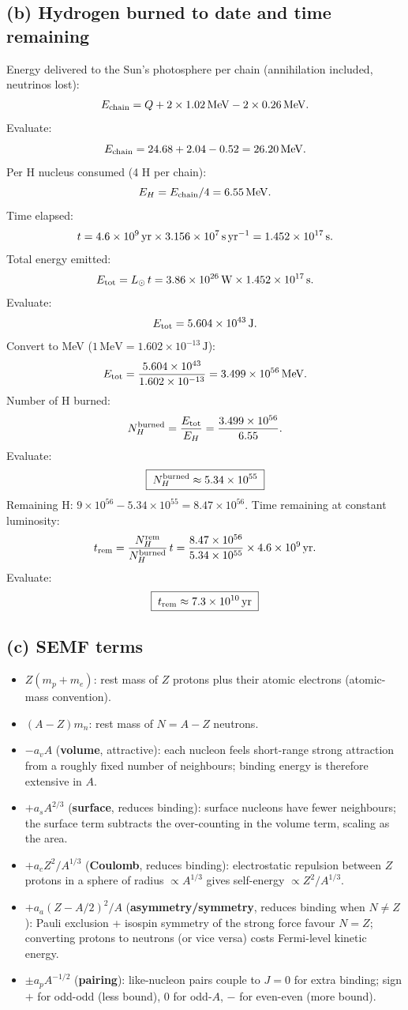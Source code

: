 \documentclass[11pt]{article}
\newcommand{\MeV}{\,\mathrm{MeV}}
\begin{document}
\subsection*{(b) Hydrogen burned to date and time remaining}

Energy delivered to the Sun's photosphere per chain (annihilation included, neutrinos lost):
\[
E_{\rm chain} = Q + 2\times 1.02\MeV - 2\times 0.26\MeV.
\]
Evaluate:
\[
E_{\rm chain} = 24.68 + 2.04 - 0.52 = 26.20\MeV.
\]
Per H nucleus consumed (4 H per chain):
\[
E_H = E_{\rm chain}/4 = 6.55\MeV.
\]
Time elapsed:
\[
t = 4.6\times 10^9\,\text{yr} \times 3.156\times 10^7\,\text{s\,yr}^{-1} = 1.452\times 10^{17}\,\text{s}.
\]
Total energy emitted:
\[
E_{\rm tot} = L_\odot\, t = 3.86\times 10^{26}\,\text{W}\times 1.452\times 10^{17}\,\text{s}.
\]
Evaluate:
\[
E_{\rm tot} = 5.604\times 10^{43}\,\text{J}.
\]
Convert to MeV ($1\MeV=1.602\times 10^{-13}\,\text{J}$):
\[
E_{\rm tot} = \frac{5.604\times 10^{43}}{1.602\times 10^{-13}} = 3.499\times 10^{56}\MeV.
\]
Number of H burned:
\[
N_H^{\rm burned} = \frac{E_{\rm tot}}{E_H} = \frac{3.499\times 10^{56}}{6.55}.
\]
Evaluate:
\[
\boxed{\;N_H^{\rm burned} \approx 5.34\times 10^{55}\;}
\]
Remaining H: $9\times 10^{56} - 5.34\times 10^{55} = 8.47\times 10^{56}$. Time remaining at constant luminosity:
\[
t_{\rm rem} = \frac{N_H^{\rm rem}}{N_H^{\rm burned}}\,t = \frac{8.47\times 10^{56}}{5.34\times 10^{55}}\times 4.6\times 10^9\,\text{yr}.
\]
Evaluate:
\[
\boxed{\;t_{\rm rem} \approx 7.3\times 10^{10}\,\text{yr}\;}
\]

\subsection*{(c) SEMF terms}

\begin{itemize}
\item $Z(m_p+m_e)$: rest mass of $Z$ protons plus their atomic electrons (atomic-mass convention).
\item $(A-Z)m_n$: rest mass of $N=A-Z$ neutrons.
\item $-a_v A$ (\textbf{volume}, attractive): each nucleon feels short-range strong attraction from a roughly fixed number of neighbours; binding energy is therefore extensive in $A$.
\item $+a_s A^{2/3}$ (\textbf{surface}, reduces binding): surface nucleons have fewer neighbours; the surface term subtracts the over-counting in the volume term, scaling as the area.
\item $+a_c Z^2/A^{1/3}$ (\textbf{Coulomb}, reduces binding): electrostatic repulsion between $Z$ protons in a sphere of radius $\propto A^{1/3}$ gives self-energy $\propto Z^2/A^{1/3}$.
\item $+a_a (Z-A/2)^2/A$ (\textbf{asymmetry/symmetry}, reduces binding when $N\ne Z$): Pauli exclusion + isospin symmetry of the strong force favour $N=Z$; converting protons to neutrons (or vice versa) costs Fermi-level kinetic energy.
\item $\pm a_p A^{-1/2}$ (\textbf{pairing}): like-nucleon pairs couple to $J=0$ for extra binding; sign $+$ for odd-odd (less bound), $0$ for odd-$A$, $-$ for even-even (more bound).
\end{itemize}
\end{document}

